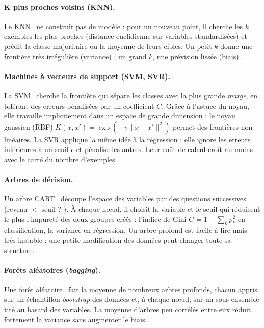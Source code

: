 \paragraph{K plus proches voisins (KNN).} Le KNN~\cite{cover1967} ne construit pas de modèle : pour un nouveau point, il cherche les $k$ exemples les plus proches (distance euclidienne sur variables standardisées) et prédit la classe majoritaire ou la moyenne de leurs cibles. Un petit $k$ donne une frontière très irrégulière (variance) ; un grand $k$, une prévision lissée (biais).

\paragraph{Machines à vecteurs de support (SVM, SVR).} La SVM~\cite{cortes1995} cherche la frontière qui sépare les classes avec la plus grande \emph{marge}, en tolérant des erreurs pénalisées par un coefficient $C$. Grâce à l'astuce du noyau, elle travaille implicitement dans un espace de grande dimension : le noyau gaussien (RBF) $K(x,x') = \exp(-\gamma\lVert x - x'\rVert^2)$ permet des frontières non linéaires. La SVR applique la même idée à la régression : elle ignore les erreurs inférieures à un seuil $\epsilon$ et pénalise les autres. Leur coût de calcul croît au moins avec le carré du nombre d'exemples.

\paragraph{Arbres de décision.} Un arbre CART~\cite{breiman1984} découpe l'espace des variables par des questions successives (\og revenu $<$ seuil ? \fg{}). À chaque nœud, il choisit la variable et le seuil qui réduisent le plus l'impureté des deux groupes créés : l'indice de Gini $G = 1 - \sum_k p_k^2$ en classification, la variance en régression. Un arbre profond est facile à lire mais très instable : une petite modification des données peut changer toute sa structure.

\paragraph{Forêts aléatoires (\emph{bagging}).} Une forêt aléatoire~\cite{breiman2001} fait la moyenne de nombreux arbres profonds, chacun appris sur un échantillon \emph{bootstrap} des données et, à chaque nœud, sur un sous-ensemble tiré au hasard des variables. La moyenne d'arbres peu corrélés entre eux réduit fortement la variance sans augmenter le biais.

